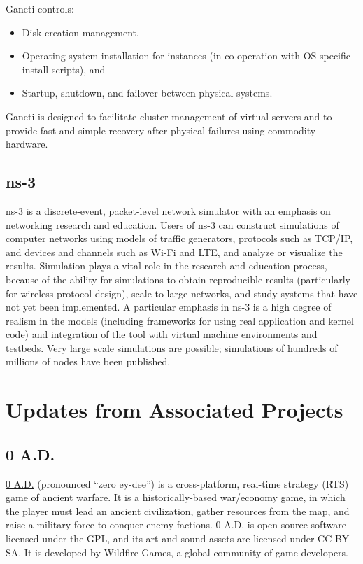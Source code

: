 \documentclass[a4paper]{report}
\begin{document}
Ganeti controls:

\begin{itemize}

\item Disk creation management,
\item Operating system installation for instances (in co-operation with OS-specific install scripts), and
\item Startup, shutdown, and failover between physical systems.

\end{itemize}

Ganeti is designed to facilitate cluster management of virtual servers and to provide fast and simple recovery after physical failures using commodity hardware.

\subsection{ns-3}

\href{https://www.nsnam.org/}{ns-3} is a discrete-event, packet-level network simulator with an emphasis on networking research and education. Users of ns-3 can construct simulations of computer networks using models of traffic generators, protocols such as TCP/IP, and devices and channels such as Wi-Fi and LTE, and analyze or visualize the results. Simulation plays a vital role in the research and education process, because of the ability for simulations to obtain reproducible results (particularly for wireless protocol design), scale to large networks, and study systems that have not yet been implemented. A particular emphasis in ns-3 is a high degree of realism in the models (including frameworks for using real application and kernel code) and integration of the tool with virtual machine environments and testbeds. Very large scale simulations are possible; simulations of hundreds of millions of nodes have been published.

\section{Updates from Associated Projects}

\subsection{0 A.D.}

\href{https://play0ad.com/}{0 A.D.} (pronounced ``zero ey-dee'') is a cross-platform, real-time strategy (RTS) game of ancient warfare. It is a historically-based war/economy game, in which the player must lead an ancient civilization, gather resources from the map, and raise a military force to conquer enemy factions. 0 A.D.  is open source software licensed under the GPL, and its art and sound assets are licensed under CC BY-SA. It is developed by Wildfire Games, a global community of game developers.
\end{document}
